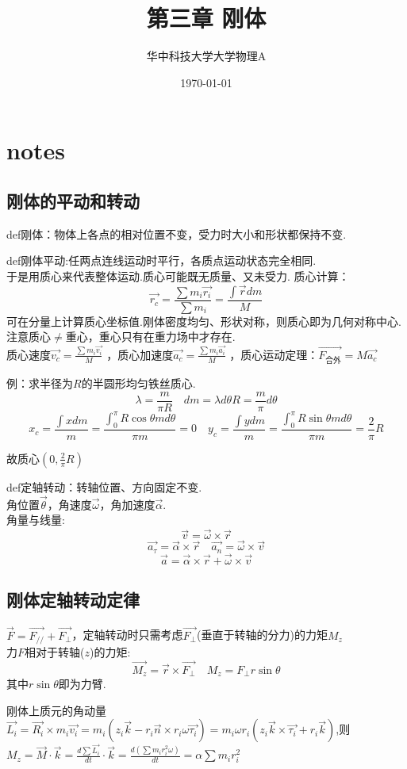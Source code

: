 \documentclass[10pt,a4paper]{article}
\title{第三章 刚体}
\author{华中科技大学大学物理A}
\date{\today}
\begin{document}
\maketitle
\section{notes}
\subsection{刚体的平动和转动}
def刚体：物体上各点的相对位置不变，受力时大小和形状都保持不变.

def刚体平动:任两点连线运动时平行，各质点运动状态完全相同.
\\于是用质心来代表整体运动.质心可能既无质量、又未受力.
质心计算：
\[
\vec{r_c}=\frac{\sum m_i\vec{r_i}}{\sum m_i}
=\frac{\int\vec{r}dm}{M}
\]
可在分量上计算质心坐标值.刚体密度均匀、形状对称，则质心即为几何对称中心.
注意质心$\neq$重心，重心只有在重力场中才存在.
\\质心速度$\vec{v_c}=\frac{\sum m_i\vec{v_i}}{M}$
，质心加速度$\vec{a_c}=\frac{\sum m_i\vec{a_i}}{M}$
，质心运动定理：$\vec{F_\text{合外}}=M\vec{a_c}$

{\fontsize{8pt}{8pt}\selectfont
例：求半径为$R$的半圆形均匀铁丝质心.
\[\lambda=\frac{m}{\pi R}\quad dm=\lambda d\theta R=\frac{m}{\pi}d\theta
\]
\[x_c=\frac{\int xdm}{m}=\frac{\int_0^\pi R\cos\theta md\theta}{\pi m}=0
\quad y_c=\frac{\int ydm}{m}=\frac{\int_0^\pi R\sin\theta md\theta}{\pi m}=\frac{2}{\pi}R\]

故质心$(0,\frac{2}{\pi}R)$
}

def定轴转动：转轴位置、方向固定不变.\\
角位置$\vec{\theta}$，角速度$\vec{\omega}$，角加速度$\vec{\alpha}$.\\
角量与线量:
\[\vec{v}=\vec{\omega}\times\vec{r}\]
\[\boxed{\vec{a_{\tau}}=\vec{\alpha}\times\vec{r}} \quad\vec{a_n}=\vec{\omega}\times\vec{v}\]
\[\vec{a}=\vec{\alpha}\times\vec{r}+\vec{\omega}\times\vec{v}\]
\subsection{刚体定轴转动定律}
$\vec{F}=\vec{F_{//}}+\vec{F_\perp}$，定轴转动时只需考虑$\vec{F_{\perp}}$(垂直于转轴的分力)的力矩$M_z$
\\力$F$相对于转轴($z$)的力矩:
\[\vec{M_z}=\vec{r}\times\vec{F_\perp}\quad M_z=F_\perp r\sin\theta\]
其中$r\sin\theta$即为力臂.

{
\fontsize{8pt}{8pt}\selectfont
刚体上质元的角动量$\vec{L_i}=\vec{R_i}\times m_i\vec{v_i}=m_i(z_i\vec{k}-r_i\vec{n}\times r_i\omega\vec{\tau_i})
=m_i\omega r_i(z_i\vec{k}\times \vec{\tau_i}+r_i\vec{k})$,则
$M_z=\vec{M}\cdot\vec{k}=\frac{d\sum \vec{L_i}}{dt}\cdot\vec{k}=\frac{d(\sum m_ir_i^2\omega)}{dt}=\alpha\sum m_ir_i^2$
}
\end{document}
